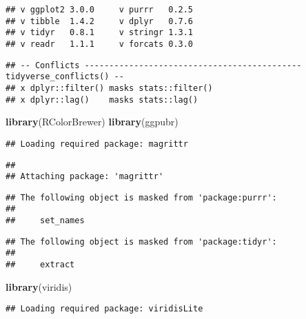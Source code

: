 \documentclass[]{article}
\newenvironment{Shaded}{\begin{snugshade}}{\end{snugshade}}
\newcommand{\KeywordTok}[1]{\textcolor[rgb]{0.13,0.29,0.53}{\textbf{#1}}}
\newcommand{\NormalTok}[1]{#1}
\begin{document}
\begin{verbatim}
## v ggplot2 3.0.0     v purrr   0.2.5
## v tibble  1.4.2     v dplyr   0.7.6
## v tidyr   0.8.1     v stringr 1.3.1
## v readr   1.1.1     v forcats 0.3.0
\end{verbatim}

\begin{verbatim}
## -- Conflicts -------------------------------------------- tidyverse_conflicts() --
## x dplyr::filter() masks stats::filter()
## x dplyr::lag()    masks stats::lag()
\end{verbatim}

\begin{Shaded}
\begin{Highlighting}[]
\KeywordTok{library}\NormalTok{(RColorBrewer)}
\KeywordTok{library}\NormalTok{(ggpubr)}
\end{Highlighting}
\end{Shaded}

\begin{verbatim}
## Loading required package: magrittr
\end{verbatim}

\begin{verbatim}
## 
## Attaching package: 'magrittr'
\end{verbatim}

\begin{verbatim}
## The following object is masked from 'package:purrr':
## 
##     set_names
\end{verbatim}

\begin{verbatim}
## The following object is masked from 'package:tidyr':
## 
##     extract
\end{verbatim}

\begin{Shaded}
\begin{Highlighting}[]
\KeywordTok{library}\NormalTok{(viridis)}
\end{Highlighting}
\end{Shaded}

\begin{verbatim}
## Loading required package: viridisLite
\end{verbatim}
\end{document}
